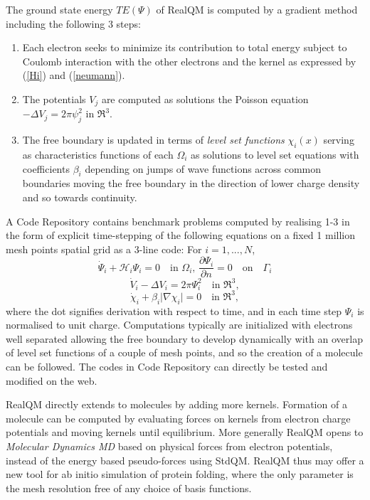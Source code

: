 \documentclass[11pt]{article} %
\begin{document}
The ground state energy $TE(\Psi )$ of RealQM is computed by a gradient method including the following 3 steps: 
\begin{enumerate}
\item Each electron seeks to minimize its contribution to total energy subject to Coulomb interaction with the other electrons and the kernel as expressed by (\ref{Hi}) and (\ref{neumann}).
\item The potentials $V_j$ are computed as solutions the Poisson equation $-\Delta V_j=2\pi\psi_j^2$ in $\Re^3$. 
\item The free boundary is updated in terms of \emph{level set functions} $\chi_i (x)$ serving as characteristics functions of each $\Omega_i$ as solutions to level set equations with coefficients $\beta_i$ depending on jumps of wave functions across common boundaries moving the free boundary in the direction of lower charge density and so towards continuity. 
\end{enumerate}
A Code Repository \cite{coderepository} contains benchmark problems computed by realising 1-3 in the form of explicit time-stepping of the following equations on a fixed 1 million mesh points spatial grid as a 3-line code: For  $i=1,...,N$,
\begin{equation}\label{Hj2}
\dot \Psi_i + \mathcal{H}_i\Psi_i=0\quad\mbox{in }\Omega_i,\, \frac{\partial\Psi_i}{\partial n}=0\quad\mbox{on}\quad\Gamma_i
\end{equation} 
\begin{equation}\label{Hj2}
\dot V_i -\Delta V_i=2\pi\Psi_i^2\quad\mbox{in }\Re^3,
\end{equation} 
\begin{equation}\label{Hj2}
\dot\chi_i +\beta_i\vert\nabla\chi_i\vert=0\quad\mbox{in }\Re^3,
\end{equation} 
where the dot signifies derivation with respect to time,  and in each time step $\Psi_i$ is normalised to unit charge. 
Computations typically are initialized with electrons well separated allowing the free boundary to develop dynamically with an overlap of level set functions of a couple of mesh points,  and so the creation of a molecule can be followed.  The codes in Code Repository can directly be tested and modified on the web.  

RealQM directly extends to molecules by adding more kernels.  Formation of a molecule can be computed
by evaluating forces on kernels from electron charge potentials and moving kernels until equilibrium.  More generally RealQM opens to \emph{Molecular Dynamics MD} based on physical forces from electron potentials,  instead of the energy based pseudo-forces using StdQM.  RealQM thus may offer a new tool for ab initio simulation of protein folding,  where the only parameter is the mesh resolution free of any choice of basis functions. 
\end{document}
